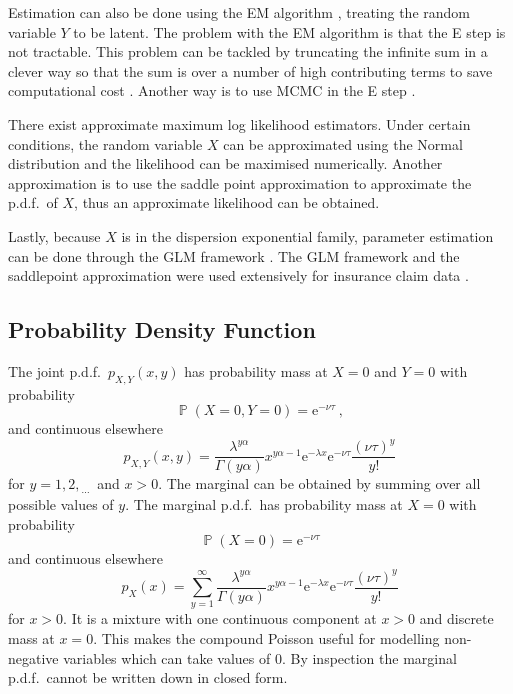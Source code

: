 \documentclass[a4paper]{proc}
\DeclareMathOperator{\prob}{\mathbb{P}}
\newcommand{\euler}{\mathrm{e}}
\newcommand{\dotdotdot}{_{\phantom{.}\cdots}}
\begin{document}
Estimation can also be done using the EM algorithm \cite{dempster1977maximum}, treating the random variable $Y$ to be latent. The problem with the EM algorithm is that the E step is not tractable. This problem can be tackled by truncating the infinite sum in a clever way so that the sum is over a number of high contributing terms to save computational cost \cite{dunn2005series}. Another way is to use MCMC in the E step \cite{booth1999maximizing}.

There exist approximate maximum log likelihood estimators. Under certain conditions, the random variable $X$ can be approximated using the Normal distribution and the likelihood can be maximised numerically. Another approximation is to use the saddle point approximation \cite{daniels1954saddlepoint} to approximate the p.d.f.~of $X$, thus an approximate likelihood can be obtained.

Lastly, because $X$ is in the dispersion exponential family, parameter estimation can be done through the GLM framework \cite{zhang2013likelihood}. The GLM framework and the saddlepoint approximation were used extensively for insurance claim data \cite{jorgensen1994fitting} \cite{jensen1991saddlepoint}.

\subsection{Probability Density Function}
The joint p.d.f.~$p_{X,Y}(x,y)$ has probability mass at $X=0$ and $Y=0$ with probability
\begin{equation}
\prob\left(X=0,Y=0\right)=\euler^{-\nu\tau} \ ,
\end{equation}
and continuous elsewhere
\begin{equation}
p_{X,Y}(x,y)=\frac{\lambda^{y\alpha}}{\Gamma(y\alpha)}x^{y\alpha-1}\euler^{-\lambda x}\euler^{-\nu\tau}\frac{(\nu\tau)^y}{y!}
\end{equation}
for $y=1,2,\dotdotdot$ and $x>0$. The marginal can be obtained by summing over all possible values of $y$. The marginal p.d.f.~has probability mass at $X=0$ with probability
\begin{equation}
\prob(X=0)=\euler^{-\nu\tau}
\end{equation}
and continuous elsewhere
\begin{equation}
p_{X}(x)=\sum_{y=1}^{\infty}\frac{\lambda^{y\alpha}}{\Gamma(y\alpha)}x^{y\alpha-1}\euler^{-\lambda x}\euler^{-\nu\tau}\frac{(\nu\tau)^y}{y!}
\end{equation}
for $x>0$. It is a mixture with one continuous component at $x>0$ and discrete mass at $x=0$. This makes the compound Poisson useful for modelling non-negative variables which can take values of 0. By inspection the marginal p.d.f.~cannot be written down in closed form.
\end{document}
